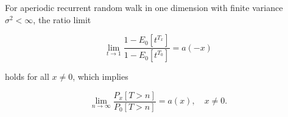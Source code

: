 For aperiodic recurrent random walk in one dimension with finite variance $\sigma^2 < \infty$, the ratio limit

$$\lim_{t \to 1} \frac{1 - E_0[t^{T_x}]}{1 - E_0[t^{T_0}]} = a(-x)$$

holds for all $x \neq 0$, which implies

$$\lim_{n \to \infty} \frac{P_x[T > n]}{P_0[T > n]} = a(x), \quad x \neq 0.$$
